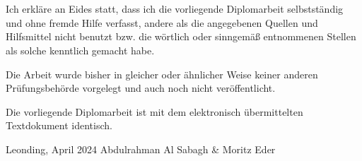\thispagestyle{empty}
\vspace{3cm}
~ \\ \\
Ich erkläre an Eides statt, dass ich die vorliegende Diplomarbeit selbstständig und ohne fremde Hilfe verfasst, andere als die angegebenen Quellen und Hilfsmittel nicht benutzt bzw. die wörtlich oder sinngemäß entnommenen Stellen als solche kenntlich gemacht habe.

Die Arbeit wurde bisher in gleicher oder ähnlicher Weise keiner anderen Prüfungsbehörde vorgelegt und auch noch nicht veröffentlicht.

Die vorliegende Diplomarbeit ist mit dem elektronisch übermittelten Textdokument identisch.
\vspace{3cm}
\begin{tabbing}
    Leonding, April 2024 \hspace{5cm} Abdulrahman Al Sabagh \& Moritz Eder
\end{tabbing}
\vspace{10cm}
\newpage
\setcounter{page}{1}
